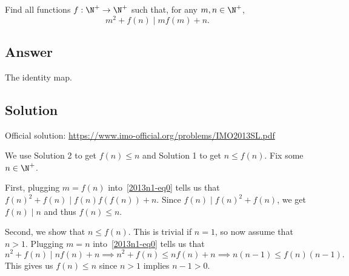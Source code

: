 Find all functions $f : \N^+ \to \N^+$ such that, for any $m, n \in \N^+$,
\[ m^2 + f(n) \mid m f(m) + n. \tag{*}\label{2013n1-eq0} \]



\subsection*{Answer}

The identity map.



\subsection*{Solution}

Official solution: \url{https://www.imo-official.org/problems/IMO2013SL.pdf}

We use Solution 2 to get $f(n) \leq n$ and Solution 1 to get $n \leq f(n)$.
Fix some $n \in \N^+$.

First, plugging $m = f(n)$ into~\eqref{2013n1-eq0} tells us that $f(n)^2 + f(n) \mid f(n) f(f(n)) + n$.
Since $f(n) \mid f(n)^2 + f(n)$, we get $f(n) \mid n$ and thus $f(n) \leq n$.

Second, we show that $n \leq f(n)$.
This is trivial if $n = 1$, so now assume that $n > 1$.
Plugging $m = n$ into~\eqref{2013n1-eq0} tells us that
\[ n^2 + f(n) \mid n f(n) + n \implies n^2 + f(n) \leq n f(n) + n \implies n(n - 1) \leq f(n) (n - 1). \]
This gives us $f(n) \leq n$ since $n > 1$ implies $n - 1 > 0$.
